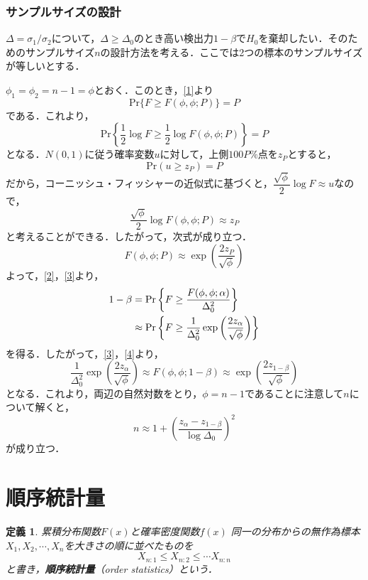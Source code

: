 \documentclass{jsarticle}
\newtheorem{dfn}{定義}[section]
\begin{document}
\subsubsection{サンプルサイズの設計}
$\Delta=\sigma_1/\sigma_2$について，$\Delta \geq \Delta_0$のとき高い検出力$1-\beta$で$H_0$を棄却したい．そのためのサンプルサイズ$n$の設計方法を考える．ここでは2つの標本のサンプルサイズが等しいとする．

$\phi_1=\phi_2=n-1=\phi$とおく．このとき，\eqref{1}より
\[ \mathrm{Pr}\{F\geq F(\phi, \phi; P)\}=P \]
である．これより，
\[ \mathrm{Pr}\left\{ \frac{1}{2}\log F\geq \frac{1}{2}\log F(\phi, \phi; P)\right\}=P \]
となる．$N(0,1)$に従う確率変数$u$に対して，上側$100P\%$点を$z_P$とすると，
\[ \mathrm{Pr}(u\geq z_P)=P \]
だから，コーニッシュ・フィッシャーの近似式に基づくと，$\dfrac{\sqrt{\phi}}{2}\log F\approx u$なので，
\[ \frac{\sqrt{\phi}}{2}\log F(\phi, \phi; P)\approx z_P \]
と考えることができる．したがって，次式が成り立つ．
\begin{equation}
F(\phi, \phi; P)\approx \exp \left(\frac{2z_P}{\sqrt{\phi}}\right) \label{3}
\end{equation}
よって，\eqref{2}，\eqref{3}より，
\begin{align}
1-\beta &=\mathrm{Pr}\left\{ F\geq \frac{F(\phi, \phi; \alpha)}{\Delta_0^2}\right\} \notag \\
&\approx \mathrm{Pr}\left\{F\geq \frac{1}{\Delta_0^2}\exp \left(\frac{2z_{\alpha}}{\sqrt{\phi}}\right) \right\} \label{4}
\end{align}
を得る．したがって，\eqref{3}，\eqref{4}より，
\[ \frac{1}{\Delta_0^2}\exp \left(\frac{2z_{\alpha}}{\sqrt{\phi}}\right) \approx F(\phi, \phi; 1-\beta)
\approx \exp \left(\frac{2z_{1-\beta}}{\sqrt{\phi}}\right) \]
となる．これより，両辺の自然対数をとり，$\phi=n-1$であることに注意して$n$について解くと，
\[ n\approx 1+\left(\frac{z_{\alpha}-z_{1-\beta}}{\log \Delta_0}\right)^2 \]
が成り立つ．


\section{順序統計量}
\begin{dfn}
累積分布関数$F(x)$と確率密度関数$f(x)$
同一の分布からの無作為標本$X_1,X_2,\dotsb,X_n$を大きさの順に並べたものを
\[ X_{n:1} \leq X_{n:2} \leq \dotsb X_{n:n} \]
と書き，\textbf{順序統計量}（order statistics）という．
\end{dfn}
\end{document}
